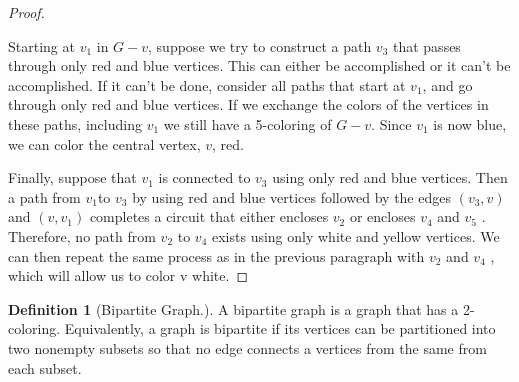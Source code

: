 \documentclass[10pt,]{book}
\theoremstyle{plain}
\theoremstyle{definition}
\newtheorem{definition}[theorem]{Definition}
\theoremstyle{definition}
\theoremstyle{definition}
\theoremstyle{definition}
\theoremstyle{definition}
\numberwithin{equation}{section}
\begin{document}
\begin{proof}
\begin{figure}
\end{figure}
\par
Starting at \(v_1\) in \(G-v\), suppose we try to construct a path \(v_3\) that passes through only red and blue vertices.  This can either be
accomplished or it can't be accomplished. If it can't be done, consider all paths that start at \(v_1\), and go through only red and blue vertices.
If we exchange the colors of the vertices in these paths, including \(v_1\) we still have a 5-coloring of \(G - v\). Since \(v_1\) is now blue, we
can color the central vertex, \(v\), red.%
\par
Finally, suppose that \(v_1\) is connected to \(v_3\) using only red and blue vertices. Then a path from \(v_{1 }\)to \(v_3\) by using red and blue
vertices followed by the edges \(\left(v_3,v\right)\) and \(\left(v,v_1\right)\) completes a circuit that either encloses \(v_2\) or encloses \(v_4\)
and \(v_5\) . Therefore, no path from \(v_2\) to \(v_4\) exists using only white and yellow vertices. We can then repeat the same process as in the
previous paragraph with \(v_2\) and \(v_4\) , which will allow us to color v white.%
\end{proof}
\begin{definition}[Bipartite Graph.]\label{def-bipartite-graph}
A bipartite graph is a graph that has a 2-coloring. Equivalently, a graph is bipartite if its vertices
can be partitioned into two nonempty subsets so that no edge connects a vertices from the same from each subset.%
\end{definition}
\end{document}
